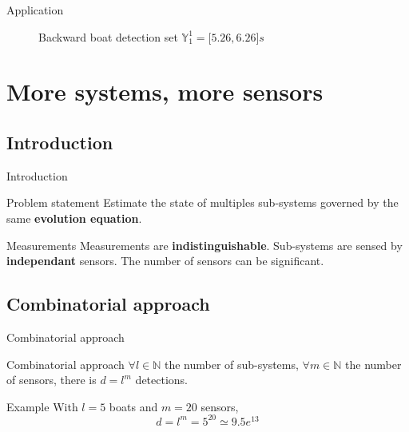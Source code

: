 \documentclass{beamer}
\begin{document}
\begin{frame}{Application}
\begin{minipage}{0.45\textwidth}
\begin{figure}
                            \caption{Backward boat detection set $\mathbb{Y}_1^1 = \lbrack5.26, 6.26\rbrack s$}
                    \end{figure}
                \end{minipage}
            \end{frame}
            

    \section{More systems, more sensors}

        \subsection{Introduction}

            \begin{frame}{Introduction}
                \begin{block}{Problem statement}
                    Estimate the state of multiples sub-systems governed by the same \textbf{evolution equation}.
                \end{block}
                \begin{block}{Measurements}
                    Measurements are \textbf{indistinguishable}. Sub-systems are sensed by \textbf{independant} sensors. The number of sensors can be significant.
                \end{block}
            \end{frame}

            \subsection{Combinatorial approach}

            \begin{frame}{Combinatorial approach}
                \begin{block}{Combinatorial approach}
                    $\forall l \in \mathbb{N}$ the number of sub-systems, $\forall m \in \mathbb{N}$ the number of sensors, there is $d = l^m$ detections.
                \end{block}
                \begin{exampleblock}{Example}
                    With $l = 5$ boats and $m = 20$ sensors,
                    $$d = l^m = 5^{20} \simeq 9.5e^{13}$$
                \end{exampleblock}
            \end{frame}
\end{document}
